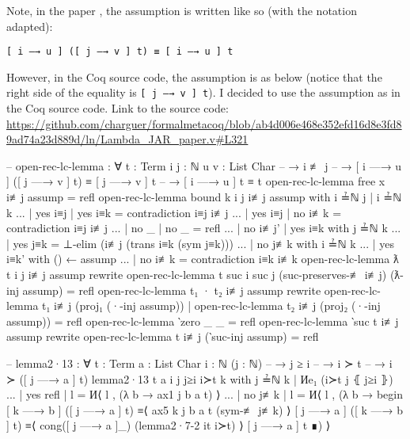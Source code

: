 \documentclass[logo,bsc,singlespacing,parskip,online]{infthesis}
\renewenvironment{code}{\mintedcopy[breaklines,breaksymbolleft=\;]{agda}}{\endmintedcopy}
\begin{document}
Note, in the paper \citep{chargueraud_locally_2012}, the assumption is written like so (with the
notation adapted):

\texttt{[ i —→ u ] ([ j —→ v ] t) ≡ [ i —→ u ] t}

However, in the Coq source code, the assumption is as below (notice that the right side of the
equality is \texttt{[ j —→ v ] t}). I decided to use the assumption as in the Coq source code. Link
to the source code:
\url{https://github.com/charguer/formalmetacoq/blob/ab4d006e468e352efd16d8e3fd89ad74a23d889d/ln/Lambda_JAR_paper.v#L321}

\begin{code}
-- open-rec-lc-lemma : ∀ {t : Term} {i j : ℕ} {u v : List Char}
--   → i ≢ j
--   → [ i —→ u ] ([ j —→ v ] t) ≡ [ j —→ v ] t
--   → [ i —→ u ] t ≡ t
open-rec-lc-lemma {free x} i≢j assump = refl
open-rec-lc-lemma {bound k} {i} {j} i≢j assump
  with i ≟ℕ j | i ≟ℕ k
... | yes i≡j | yes i≡k = contradiction i≡j i≢j
... | yes i≡j | no  i≢k = contradiction i≡j i≢j
... | no  _   | no  _   = refl
... | no i≢j' | yes i≡k with j ≟ℕ k
...   | yes j≡k = ⊥-elim (i≢j (trans i≡k (sym j≡k)))
...   | no  j≢k with i ≟ℕ k
...     | yes i≡k' with () ← assump
...     | no  i≢k  = contradiction i≡k i≢k
open-rec-lc-lemma {ƛ t} {i} {j} i≢j assump
  rewrite open-rec-lc-lemma {t} {suc i} {suc j}
      (suc-preserves-≢ i≢j)
      (ƛ-inj assump)
    = refl
open-rec-lc-lemma {t₁ · t₂} i≢j assump
  rewrite
    open-rec-lc-lemma {t₁} i≢j (proj₁ (·-inj assump))
   | open-rec-lc-lemma {t₂} i≢j (proj₂ (·-inj assump))
  = refl
open-rec-lc-lemma {‵zero} _ _ = refl
open-rec-lc-lemma {‵suc t} i≢j assump
  rewrite open-rec-lc-lemma {t} i≢j (‵suc-inj assump) = refl

-- lemma2·13 : ∀ {t : Term} {a : List Char} {i : ℕ} (j : ℕ)
--   → j ≥ i
--   → i ≻ t
--   → i ≻ ([ j —→ a ] t)
lemma2·13 {t} {a} {i} j j≥i i≻t k
  with j ≟ℕ k | Иe₁ (i≻t j ⦃ j≥i ⦄)
... | yes refl | l = И⟨ l , (λ b → ax1 j b a t) ⟩
... | no  j≢k  | l = И⟨ l , (λ b →
  begin
    [ k —→ b ] ([ j —→ a ] t)
  ≡⟨ ax5 k j b a t (sym-≢ j≢k) ⟩
    [ j —→ a ] ([ k —→ b ] t)
  ≡⟨ cong([ j —→ a ]_) (lemma2·7-2 it i≻t) ⟩
    [ j —→ a ] t
  ∎) ⟩


\end{code}
\end{document}
